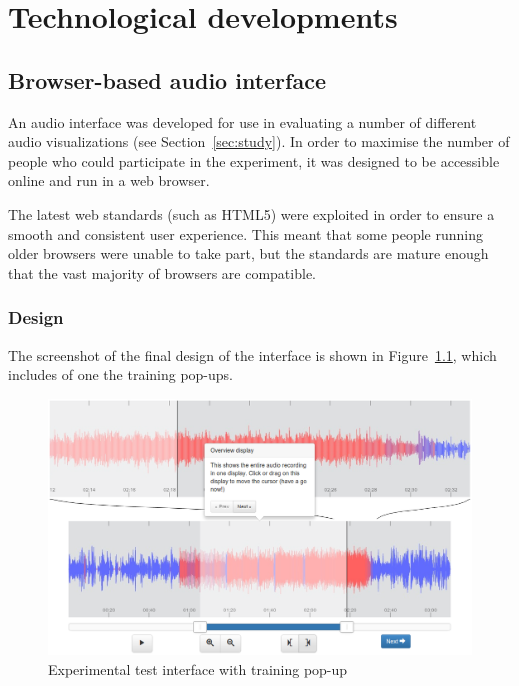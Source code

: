 \chapter{Technological developments}\label{app:tech}

\section{Browser-based audio interface}\label{sec:browser-audio-interface}
An audio interface was developed for use in evaluating a number of different audio visualizations (see
Section~\ref{sec:study}). In order to maximise the number of people who could participate in the experiment, it was
designed to be accessible online and run in a web browser.

The latest web standards (such as HTML5) were exploited in order to ensure a smooth and consistent user experience.
This meant that some people running older browsers were unable to take part, but the standards are mature enough that
the vast majority of browsers are compatible.

\subsection{Design}\label{sec:browser-audio-interface-design}
The screenshot of the  final design of the interface is shown in Figure~\ref{fig:browser-audio-interface}, which includes of one the
training pop-ups.

\begin{figure}[ht]
  \centering
  \includegraphics[width=\textwidth]{figs/interface.png}
  \caption{Experimental test interface with training pop-up}
  \label{fig:browser-audio-interface}
\end{figure}

